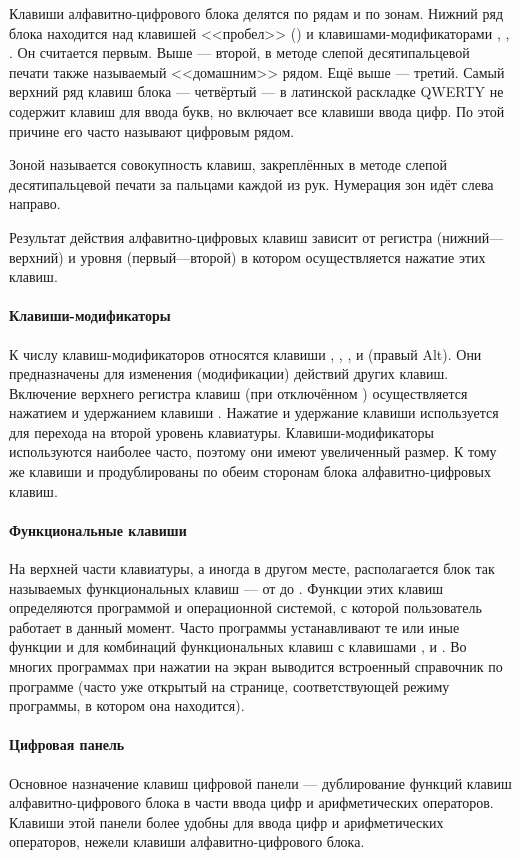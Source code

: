 Клавиши алфавитно-цифрового блока делятся по рядам и по зонам.
Нижний ряд блока находится над клавишей <<пробел>> (\Spacebar) и клавишами-модификаторами \Ctrl, \Alt, \AltGr.
Он считается первым.
Выше --- второй, в методе слепой десятипальцевой печати также называемый <<домашним>> рядом.
Ещё выше --- третий.
Самый верхний ряд клавиш блока --- четвёртый --- в латинской раскладке QWERTY не содержит клавиш для ввода букв, но включает все клавиши ввода цифр.
По этой причине его часто называют цифровым рядом.

Зоной называется совокупность клавиш, закреплённых в методе слепой десятипальцевой печати за пальцами каждой из рук.
Нумерация зон идёт слева направо.

Результат действия алфавитно-цифровых клавиш зависит от регистра (нижний---верхний) и уровня (первый---второй) в котором осуществляется нажатие этих клавиш.

\paragraph{Клавиши-модификаторы}
К числу клавиш-модификаторов относятся клавиши \Shift, \Ctrl, \CapsLock, \Alt и \AltGr (правый Alt).
Они предназначены для изменения (модификации) действий других клавиш.
Включение верхнего регистра клавиш (при отключённом \CapsLock) осуществляется нажатием и удержанием клавиши \Shift. Нажатие и удержание клавиши \AltGr используется для перехода на второй уровень клавиатуры.
Клавиши-модификаторы используются наиболее часто, поэтому они имеют увеличенный размер.
К тому же клавиши \Shift и \Ctrl продублированы по обеим сторонам блока алфавитно-цифровых клавиш.

\paragraph{Функциональные клавиши}
На верхней части клавиатуры, а иногда в другом месте, располагается блок так называемых функциональных клавиш --- от  до .
Функции этих клавиш определяются программой и операционной системой, с которой пользователь работает в данный момент.
Часто программы устанавливают те или иные функции и для комбинаций функциональных клавиш с клавишами \Shift, \Ctrl и \Alt.
Во многих программах при нажатии  на экран выводится встроенный справочник по программе (часто уже открытый на странице, соответствующей режиму программы, в котором она находится).

\paragraph{Цифровая панель}
Основное назначение клавиш цифровой панели --- дублирование функций клавиш алфавитно-цифрового блока в части ввода цифр и арифметических операторов.
Клавиши этой панели более удобны для ввода цифр и арифметических операторов, нежели клавиши алфавитно-цифрового блока.

